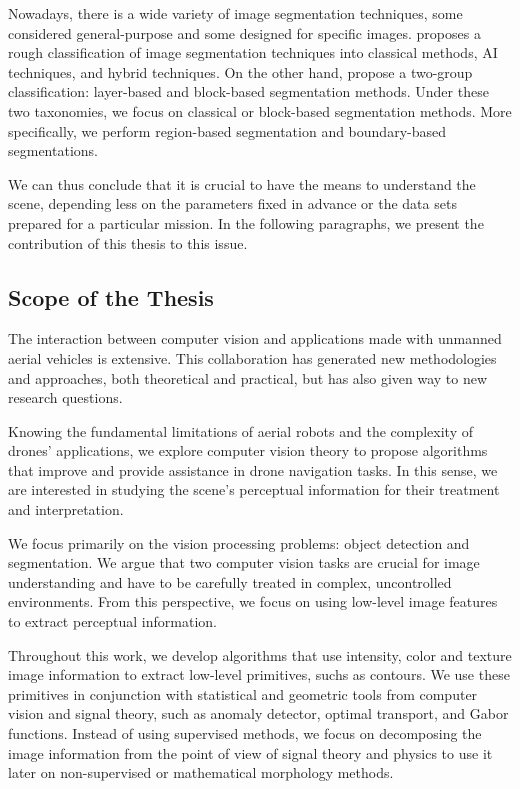 Nowadays, there is a wide variety of image segmentation techniques, some considered general-purpose and some designed for specific images. \cite{Khan:IJIG:2013} proposes a rough classification of image segmentation techniques into classical methods, AI techniques, and hybrid techniques. On the other hand, \cite{Zaitoun.Aqel:ICCMIT:2015} propose a two-group classification: layer-based and block-based segmentation methods. Under these two taxonomies, we focus on classical or block-based segmentation methods. More specifically, we perform region-based segmentation and boundary-based segmentations.

We can thus conclude that it is crucial to have the means to understand the scene, depending less on the parameters fixed in advance or the data sets prepared for a particular mission. In the following paragraphs, we present the contribution of this thesis to this issue.

\subsection*{Scope of the Thesis}
The interaction between computer vision and applications made with unmanned aerial vehicles is extensive. This collaboration has generated new methodologies and approaches, both theoretical and practical, but has also given way to new research questions. 

Knowing the fundamental limitations of aerial robots and the complexity of drones' applications, we explore computer vision theory to propose algorithms that improve and provide assistance in drone navigation tasks. In this sense, we are interested in studying the scene's perceptual information for their treatment and interpretation.

We focus primarily on the vision processing problems: object detection and segmentation. We argue that two computer vision tasks are crucial for image understanding and have to be carefully treated in complex, uncontrolled environments. From this perspective, we focus on using low-level image features to extract perceptual information.

Throughout this work, we develop algorithms that use intensity, color and texture image information to extract low-level primitives, suchs as contours. We use these primitives in conjunction with statistical and geometric tools from computer vision and signal theory, such as anomaly detector, optimal transport, and Gabor functions. Instead of using supervised methods, we focus on decomposing the image information from the point of view of signal theory and physics to use it later on non-supervised or mathematical morphology methods.

